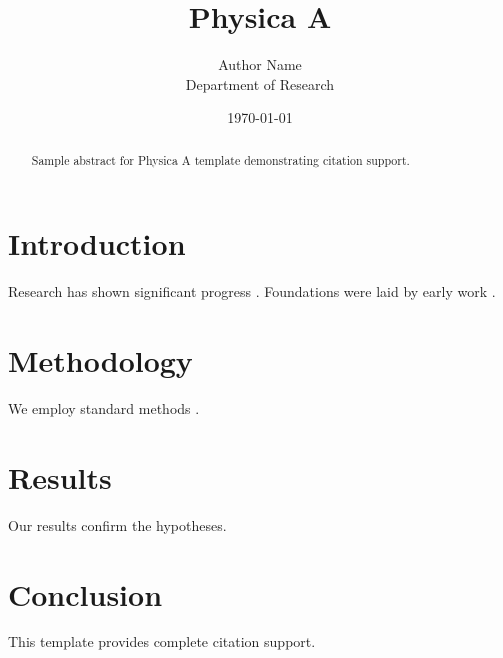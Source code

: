 ﻿\documentclass{elsarticle}
\title{Physica A}
\author{Author Name \\ \small Department of Research}
\date{\today}
\begin{document}
\maketitle

\begin{abstract}
Sample abstract for Physica A template demonstrating citation support.
\end{abstract}

\section{Introduction}
Research has shown significant progress \citep{einstein1905}. Foundations were laid by early work \citep{turing1950}.

\section{Methodology}
We employ standard methods \citep{knuth1984}.

\section{Results}
Our results confirm the hypotheses.

\section{Conclusion}
This template provides complete citation support.



\end{document}

